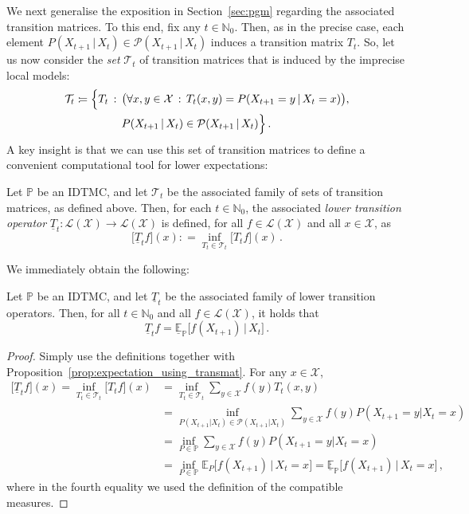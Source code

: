 \documentclass[graybox]{svmult}
\newcommand{\nats}{\mathbb{N}}
\newcommand{\natswith}{\nats_{0}}
\newcommand{\states}{\mathcal{X}}
\newcommand{\gambles}{\mathcal{L}}
\newcommand{\gamblesX}{\gambles(\states)}
\newcommand{\coloneqq}{:\!=}
\begin{document}
We next generalise the exposition in Section~\ref{sec:pgm} regarding the associated transition matrices. To this end, fix any $t\in\natswith$. Then, as in the precise case, each element $P(X_{t+1}\,\vert\,X_t)\in\mathcal{P}(X_{t+1}\,\vert\,X_t)$ induces a transition matrix $T_t$. So, let us now consider the \emph{set} $\mathcal{T}_t$ of transition matrices that is induced by the imprecise local models:
\begin{align*}
\mathcal{T}_t \coloneqq \Bigl\{ T_t\,&:\, \bigl(\forall x,y\in\states\,:\, T_t(x,y)=P(X_{t+1}=y\,\vert\,X_t=x)\bigr), \\
 &\quad P(X_{t+1}\,\vert\,X_t)\in\mathcal{P}(X_{t+1}\,\vert\,X_t) \Bigr\}\,.
\end{align*} 
A key insight is that we can use this set of transition matrices to define a convenient computational tool for lower expectations:
\begin{definition}
Let $\mathbb{P}$ be an IDTMC, and let $\mathcal{T}_t$ be the associated family of sets of transition matrices, as defined above. Then, for each $t\in\natswith$, the associated \emph{lower transition operator} $\underline{T}_t:\gamblesX\to\gamblesX$ is defined, for all $f\in\gamblesX$ and all $x\in\states$, as
\begin{equation*}
\bigl[\underline{T}_tf\bigr](x) \coloneqq \inf_{T_t\in\mathcal{T}_t}\bigl[T_tf\bigr](x)\,.
\end{equation*}
\end{definition}
We immediately obtain the following:
\begin{proposition}
Let $\mathbb{P}$ be an IDTMC, and let $\underline{T}_t$ be the associated family of lower transition operators. Then, for all $t\in\natswith$ and all $f\in\gamblesX$, it holds that
\begin{equation*}
\underline{T}_tf = \underline{\mathbb{E}}_\mathbb{P}\bigl[f(X_{t+1})\,\vert\,X_t\bigr]\,.
\end{equation*}
\end{proposition}
\begin{proof}
Simply use the definitions together with Proposition~\ref{prop:expectation_using_transmat}. For any $x\in\states$,
\begin{align*}
\bigl[\underline{T}_tf\bigr](x) = \inf_{T_t\in\mathcal{T}_t} \bigl[T_tf\bigr](x) &= \inf_{T_t\in\mathcal{T}_t} \sum_{y\in\states} f(y) T_t(x,y) \\
 &= \inf_{P(X_{t+1}\vert X_t)\in\mathcal{P}(X_{t+1}\vert X_t)} \sum_{y\in\states} f(y) P(X_{t+1}=y\vert X_t=x) \\
 &= \inf_{P\in\mathbb{P}} \sum_{y\in\states} f(y) P(X_{t+1}=y\vert X_t=x) \\
 &= \inf_{P\in\mathbb{P}} \mathbb{E}_P\bigl[f(X_{t+1})\,\big\vert\,X_t=x\bigr] = \underline{\mathbb{E}}_\mathbb{P}\bigl[f(X_{t+1})\,\big\vert\,X_t=x\bigr]\,,
\end{align*}
where in the fourth equality we used the definition of the compatible measures.
\end{proof}
\end{document}
